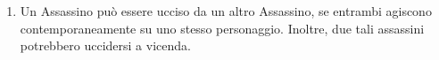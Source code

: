 \documentclass[a4paper,10pt]{article}
\begin{document}
\begin{enumerate}
	\item Un Assassino può essere ucciso da un altro Assassino, se entrambi agiscono contemporaneamente su uno stesso personaggio. Inoltre, due tali assassini potrebbero uccidersi a vicenda.
 

%	
%	


\end{enumerate}
\end{document}
